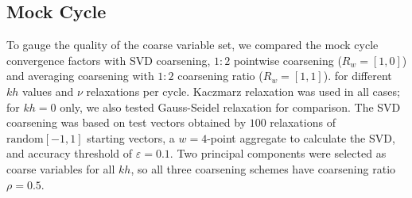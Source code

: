 \documentclass{article}
\begin{document}
\subsection{Mock Cycle}
\label{mock_cycle}
To gauge the quality of the coarse variable set, we compared the mock cycle convergence factors with SVD coarsening, $1:2$ pointwise coarsening ($R_w = [1, 0]$) and averaging coarsening with $1:2$ coarsening ratio ($R_w = [1, 1]$). for different $kh$ values and $\nu$ relaxations per cycle. Kaczmarz relaxation was used in all cases; for $kh=0$ only, we also tested Gauss-Seidel relaxation for comparison. The SVD coarsening was based on test vectors obtained by $100$ relaxations of $\text{random}[-1,1]$ starting vectors, a $w=4$-point aggregate to calculate the SVD, and accuracy threshold of  $\varepsilon=0.1$. Two principal components were selected as coarse variables for all $kh$, so all three coarsening schemes have coarsening ratio $\rho = 0.5$.
 
\end{document}
